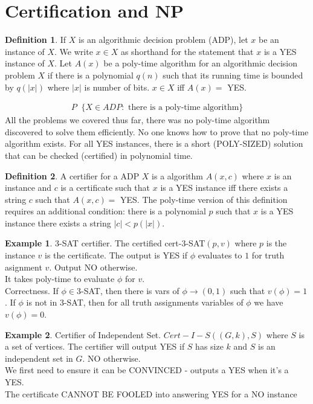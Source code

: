 \documentclass[a4paper]{article}
\theoremstyle{plain}
\newcommand*{\MyDef}{\mathrm{def}}
\newcommand*{\eqdef}{\ensuremath{\mathop{\overset{\MyDef}{=}}}}
\theoremstyle{definition}
\newtheorem{defn}{Definition}[section]
\newtheorem{exmp}{Example}[section]
\theoremstyle{remark}
\begin{document}
	\section{Certification and NP}
	\begin{defn}
		If $X$ is an algorithmic decision problem (ADP), let $x$ be an instance of $X$. We write $x \in X$ as shorthand for the statement that $x$ is a YES instance of $X$. Let $A(x)$ be a poly-time algorithm for an algorithmic decision problem $X$ if there is a polynomial $q(n)$ such that its running time is bounded by $q(|x|)$ where $|x|$ is number of bits. $x \in X$ iff $A(x) =$ YES. 
	\end{defn}
	\begin{align*}
		P \eqdef \{ X \in ADP : \text{ there is a poly-time algorithm} \}
	\end{align*}
	All the problems we covered thus far, there was no poly-time algorithm discovered to solve them efficiently. No one knows how to prove that no poly-time algorithm exists. For all YES instances, there is a short (POLY-SIZED) solution that can be checked (certified) in polynomial time. 
	\begin{defn}
		A certifier for a ADP $X$ is a algorithm $A(x,c)$ where $x$ is an instance and $c$ is a certificate such that $x$ is a YES instance iff there exists a string $c$ such that $A(x,c) = $ YES. The poly-time version of this definition requires an additional condition: there is a polynomial $p$ such that $x$ is a YES instance there exists a string $|c| < p(|x|)$.
	\end{defn}
	\begin{exmp}
		3-SAT certifier. The certified cert-$3$-SAT$(p,v)$ where $p$ is the instance $v$ is the certificate. The output is YES if $\phi$ evaluates to  $1$ for truth asignment $v$. Output NO otherwise.  \\
		It takes poly-time to evaluate $\phi$ for $v$. \\
		Correctness. If $\phi \in 3$-SAT, then there is vars of $\phi \to (0,1)$ such that $v(\phi) = 1$. If $\phi$ is not in $3$-SAT, then for all truth assignments variables of $\phi$ we have $v(\phi) = 0$. 
	\end{exmp}
	\begin{exmp}
		Certifier of Independent Set. $Cert-I-S((G,k),S)$ where $S$ is a set of vertices. The certifier will output YES if $S$ has size $k$ and $S$ is an independent set in $G$. NO otherwise. \\
		We first need to ensure it can be CONVINCED - outputs a YES when it's a YES. \\
		The certificate CANNOT BE FOOLED into answering YES for a NO instance
	\end{exmp}
\end{document}
